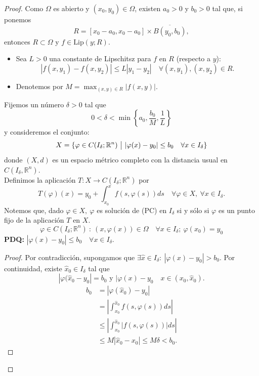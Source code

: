 \documentclass[11pt]{article}
\theoremstyle{definition} %
\newcommand{\R}{\mathbb{R}}
\begin{document}
\begin{proof}
	Como $\Omega$ es abierto y $(x_0,y_0) \in \Omega$, existen $a_0>0$ y $b_{0}>0$ tal que, si ponemos
	\[ R = [x_0-a_0,x_{0}-a_{0}] \times \overline{B(y_0,b_0)}, \]
	entonces $R \subset \Omega$ y $f \in \text{Lip}(y;R)$.
	\begin{itemize}
		\item Sea $L>0$ una constante de Lipschitsz para $f$ en $R$ (respecto a $y$):
		\[ |f(x,y_{1}) - f(x,y_{2})| \leq L |y_{1} - y_{2}|\quad \forall (x,y_{1}),(x,y_{2})\in R. \]

		\item Denotemos por $M = \max_{(x,y)\in R} |f(x,y)|$.
	\end{itemize}
	Fijemos un número $\delta>0$ tal que 
	\[ 0 < \delta < \min \left\{a_0, \frac{b_0}{M}, \frac{1}{L} \right\} \]
	y consideremos el conjunto:
	\[ X = \{ \varphi \in C(I_{\delta};\R^n) \ \big{|} \ |\varphi(x) - y_{0}| \leq b_{0} \quad \forall x \in I_{\delta} \} \]  
	donde $(X,d)$ es un espacio métrico completo con la distancia usual en $C(I_{\delta},\R^n)$. \\
	Definimos la aplicación $T: X \to C(I_{\delta};\R^n)$ por
	\[ T(\varphi)(x) = y_{0} + \int_{x_{0}}^{x} f(s,\varphi(s))ds \quad \forall \varphi \in X,\ \forall x \in I_{\delta}. \]
	Notemos que, dado $\varphi \in X, \ \varphi$ es solución de (PC) en $I_{\delta}$ si y sólo si $\varphi$ es un punto fijo de la aplicación $T$ en $X$.
	\[ \varphi \in C(I_{\delta};\R^n)\ : \ (x,\varphi(x)) \in \Omega \quad \forall x \in I_{\delta};\ \varphi(x_{0})=y_{0} \]
	\textbf{PDQ:} $|\varphi(x)-y_{0}| \leq b_{0}\quad \forall x \in I_{\delta}$.

	\begin{proof}
		Por contradicción, supongamos que $\exists \hat{x} \in I_{\delta}:\ |\varphi(x)-y_{0}| > b_{0}$. Por continuidad, existe $\hat{x}_0 \in I_{\delta}$ tal que 
		\[ |\varphi(\hat{x}_{0} - y_{0}| = b_{0} \text{ y } |\varphi(x) -y_{0}\quad x \in (x_{0},\hat{x}_0). \]
		\begin{align*}
			b_{0} & = |\varphi(\hat{x}_0)-y_{0}| \\ 
			& = \left| \int_{x_0}^{\hat{x}_0} f(s,\varphi(s))ds \right| \\
			& \leq \left| \int_{x_0}^{\hat{x}_0 } |f(s,\varphi(s))| ds \right| \\
			& \leq M |\hat{x}_0 - x_{0}| \leq M \delta < b_0 
		.\end{align*}
	\end{proof}


\end{proof}
\end{document}
